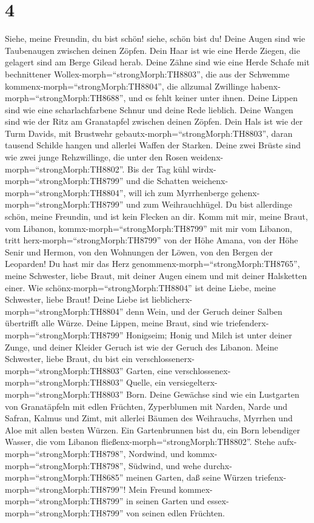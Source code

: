 \hypertarget{section-3}{%
\section{4}\label{section-3}}

 Siehe, meine Freundin, du bist schön! siehe, schön bist du!
Deine Augen sind wie Taubenaugen zwischen deinen Zöpfen. Dein Haar ist
wie eine Herde Ziegen, die gelagert sind am Berge Gilead herab.
 Deine Zähne sind wie eine Herde Schafe mit bechnittener
Wollex-morph=``strongMorph:TH8803'', die aus der Schwemme
kommenx-morph=``strongMorph:TH8804'', die allzumal Zwillinge
habenx-morph=``strongMorph:TH8688'', und es fehlt keiner unter ihnen.
 Deine Lippen sind wie eine scharlachfarbene Schnur und
deine Rede lieblich. Deine Wangen sind wie der Ritz am Granatapfel
zwischen deinen Zöpfen.  Dein Hals ist wie der Turm Davids,
mit Brustwehr gebautx-morph=``strongMorph:TH8803'', daran tausend
Schilde hangen und allerlei Waffen der Starken.  Deine zwei
Brüste sind wie zwei junge Rehzwillinge, die unter den Rosen
weidenx-morph=``strongMorph:TH8802''.  Bis der Tag kühl
wirdx-morph=``strongMorph:TH8799'' und die Schatten
weichenx-morph=``strongMorph:TH8804'', will ich zum Myrrhenberge
gehenx-morph=``strongMorph:TH8799'' und zum Weihrauchhügel. 
Du bist allerdinge schön, meine Freundin, und ist kein Flecken an dir.
 Komm mit mir, meine Braut, vom Libanon,
kommx-morph=``strongMorph:TH8799'' mit mir vom Libanon, tritt
herx-morph=``strongMorph:TH8799'' von der Höhe Amana, von der Höhe Senir
und Hermon, von den Wohnungen der Löwen, von den Bergen der Leoparden!
 Du hast mir das Herz
genommenx-morph=``strongMorph:TH8765'', meine Schwester, liebe Braut,
mit deiner Augen einem und mit deiner Halsketten einer. 
Wie schönx-morph=``strongMorph:TH8804'' ist deine Liebe, meine
Schwester, liebe Braut! Deine Liebe ist
lieblicherx-morph=``strongMorph:TH8804'' denn Wein, und der Geruch
deiner Salben übertrifft alle Würze.  Deine Lippen, meine
Braut, sind wie triefenderx-morph=``strongMorph:TH8799'' Honigseim;
Honig und Milch ist unter deiner Zunge, und deiner Kleider Geruch ist
wie der Geruch des Libanon.  Meine Schwester, liebe Braut,
du bist ein verschlossenerx-morph=``strongMorph:TH8803'' Garten, eine
verschlossenex-morph=``strongMorph:TH8803'' Quelle, ein
versiegelterx-morph=``strongMorph:TH8803'' Born.  Deine
Gewächse sind wie ein Lustgarten von Granatäpfeln mit edlen Früchten,
Zyperblumen mit Narden,  Narde und Safran, Kalmus und Zimt,
mit allerlei Bäumen des Weihrauchs, Myrrhen und Aloe mit allen besten
Würzen.  Ein Gartenbrunnen bist du, ein Born lebendiger
Wasser, die vom Libanon fließenx-morph=``strongMorph:TH8802''.
 Stehe aufx-morph=``strongMorph:TH8798'', Nordwind, und
kommx-morph=``strongMorph:TH8798'', Südwind, und wehe
durchx-morph=``strongMorph:TH8685'' meinen Garten, daß seine Würzen
triefenx-morph=``strongMorph:TH8799''! Mein Freund
kommex-morph=``strongMorph:TH8799'' in seinen Garten und
essex-morph=``strongMorph:TH8799'' von seinen edlen Früchten.

